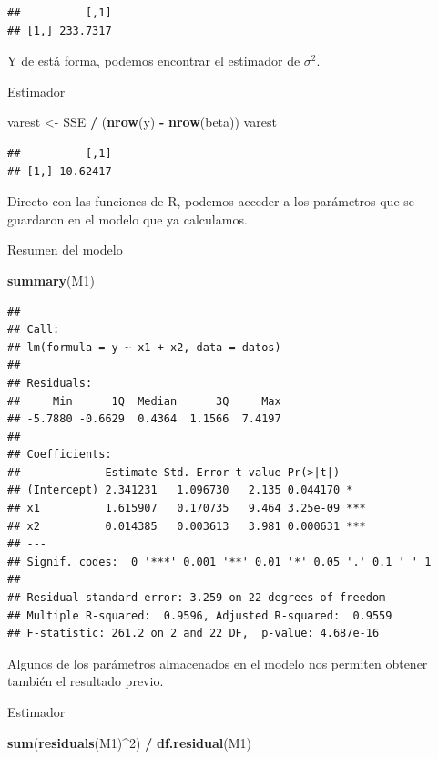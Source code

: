 \documentclass[
]{book}
\newenvironment{Shaded}{\begin{snugshade}}{\end{snugshade}}
\newcommand{\DecValTok}[1]{\textcolor[rgb]{0.00,0.00,0.81}{#1}}
\newcommand{\FunctionTok}[1]{\textcolor[rgb]{0.13,0.29,0.53}{\textbf{#1}}}
\newcommand{\NormalTok}[1]{#1}
\newcommand{\OtherTok}[1]{\textcolor[rgb]{0.56,0.35,0.01}{#1}}
\newcommand{\SpecialCharTok}[1]{\textcolor[rgb]{0.81,0.36,0.00}{\textbf{#1}}}
\begin{document}
\begin{verbatim}
##          [,1]
## [1,] 233.7317
\end{verbatim}

Y de está forma, podemos encontrar el estimador de \(\sigma^2\).

Estimador

\begin{Shaded}
\begin{Highlighting}[]
\NormalTok{varest }\OtherTok{\textless{}{-}}\NormalTok{ SSE }\SpecialCharTok{/}\NormalTok{ (}\FunctionTok{nrow}\NormalTok{(y) }\SpecialCharTok{{-}} \FunctionTok{nrow}\NormalTok{(beta))}
\NormalTok{varest}
\end{Highlighting}
\end{Shaded}

\begin{verbatim}
##          [,1]
## [1,] 10.62417
\end{verbatim}

Directo con las funciones de R, podemos acceder a los parámetros que se guardaron en el modelo que ya calculamos.

Resumen del modelo

\begin{Shaded}
\begin{Highlighting}[]
\FunctionTok{summary}\NormalTok{(M1)}
\end{Highlighting}
\end{Shaded}

\begin{verbatim}
## 
## Call:
## lm(formula = y ~ x1 + x2, data = datos)
## 
## Residuals:
##     Min      1Q  Median      3Q     Max 
## -5.7880 -0.6629  0.4364  1.1566  7.4197 
## 
## Coefficients:
##             Estimate Std. Error t value Pr(>|t|)    
## (Intercept) 2.341231   1.096730   2.135 0.044170 *  
## x1          1.615907   0.170735   9.464 3.25e-09 ***
## x2          0.014385   0.003613   3.981 0.000631 ***
## ---
## Signif. codes:  0 '***' 0.001 '**' 0.01 '*' 0.05 '.' 0.1 ' ' 1
## 
## Residual standard error: 3.259 on 22 degrees of freedom
## Multiple R-squared:  0.9596, Adjusted R-squared:  0.9559 
## F-statistic: 261.2 on 2 and 22 DF,  p-value: 4.687e-16
\end{verbatim}

Algunos de los parámetros almacenados en el modelo nos permiten obtener también el resultado previo.

Estimador

\begin{Shaded}
\begin{Highlighting}[]
\FunctionTok{sum}\NormalTok{(}\FunctionTok{residuals}\NormalTok{(M1)}\SpecialCharTok{\^{}}\DecValTok{2}\NormalTok{) }\SpecialCharTok{/} \FunctionTok{df.residual}\NormalTok{(M1)}
\end{Highlighting}
\end{Shaded}
\end{document}
